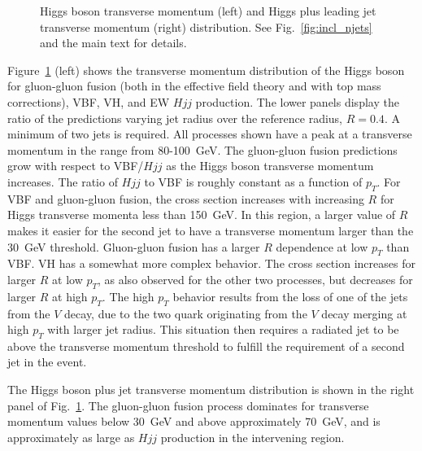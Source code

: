 \documentclass[10pt,prd,fleqn,superscriptaddress,notitlepage,nofootinbib,preprintnumbers,nobalancelastpage]{revtex4-1}
\newcommand{\VBF}{VBF\xspace}
\newcommand{\VH}{VH\xspace}
\begin{document}
\begin{figure}[p]
\begin{minipage}{.295\textwidth}
  \end{minipage}
\caption{Higgs boson transverse momentum (left) and Higgs plus leading jet transverse momentum (right) distribution.
See Fig.~\ref{fig:incl_njets} and the main text for details.}
\label{fig:incl_pth}
\end{figure}


Figure~\ref{fig:incl_pth} (left) shows the transverse momentum distribution of the Higgs boson for gluon-gluon fusion (both in the effective field theory and with top mass corrections), \VBF, \VH, and EW $Hjj$ production. The lower panels display the ratio of the predictions varying jet radius over the reference radius, $R=0.4$. A minimum of two jets is required. All processes shown have a peak at a transverse momentum in the range from 80-100~GeV. The gluon-gluon fusion predictions  grow with respect to \VBF/$Hjj$ as the Higgs boson transverse momentum increases. The ratio of $Hjj$ to \VBF is roughly constant as a function of $p_T$. For \VBF and gluon-gluon fusion, the cross section increases with increasing $R$ for Higgs transverse momenta less than 150~GeV. In this region, a larger value of $R$ makes it easier for the second jet to have a transverse momentum larger than the 30~GeV threshold. Gluon-gluon fusion has a larger $R$ dependence at low $p_T$ than \VBF.
\VH has a somewhat more complex behavior. The cross section increases for larger $R$ at low $p_T$, as also observed for the other two processes, but decreases for larger $R$ at high $p_T$. The high $p_T$ behavior  results from the loss of one of the jets from the $V$ decay,
due to the two quark originating from the $V$ decay merging at high $p_T$ with larger jet radius. This situation then requires a radiated jet to be above the transverse momentum threshold to fulfill the requirement of a second jet in the event.



The Higgs boson plus jet transverse momentum distribution is shown in the right panel of Fig.~\ref{fig:incl_pth}.
The gluon-gluon fusion process dominates for transverse momentum values below 30~GeV and above approximately 70~GeV,
and is approximately as large as $Hjj$ production in the intervening region.
\end{document}
